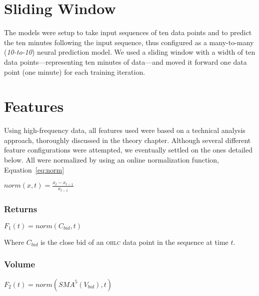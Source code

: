 \begin{multicols}{2}
\section{Sliding Window}

The models were setup to take input sequences of ten data points and to predict
the ten minutes following the input sequence, thus configured as a many-to-many
(\textit{10-to-10}) neural prediction model.  We used a sliding window with a
width of ten data points---representing ten minutes of data---and moved it
forward one data point (one minute) for each training iteration.

\section{Features}

Using high-frequency data, all features used were based on a technical analysis
approach, thoroughly discussed in the theory chapter.  Although several
different feature configurations were attempted, we eventually settled on the
ones detailed below.  All were normalized by using an online normalization
function, Equation~\ref{eq:norm}

\begin{Figure}
  $norm(x, t) = \frac{{x_t}-{x_{t-1}}}{x_{t-1}}$
\label{eq:norm}
\end{Figure}

\subsubsection{Returns}

\begin{Figure}
  $F_1(t) = {norm}(C_{bid}, t)$
\end{Figure}

\noindent Where $C_{bid}$ is the close bid of an \textsc{ohlc} data point in the
sequence at time $t$.

\subsubsection{Volume}

\begin{Figure}
  $F_2(t) = {{norm}({SMA^{5}}(V_{bid}), t)}$
\end{Figure}


\end{multicols}
